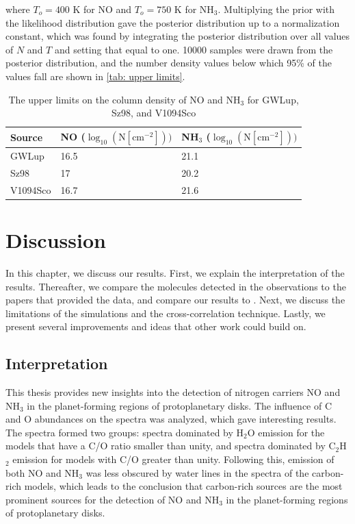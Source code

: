 \documentclass[oneside, single, authoryear, semicolon, 12pt]{lion-msc}
\newcommand{\4}{$_4$}
\newcommand{\3}{$_3$}
\newcommand{\2}{$_2$}
\begin{document}
where $T_o=400$ K for NO and $T_o=750$ K for NH\3. Multiplying the prior with the likelihood distribution gave the posterior distribution up to a normalization constant, which was found by integrating the posterior distribution over all values of $N$ and $T$ and setting that equal to one. 10000 samples were drawn from the posterior distribution, and the number density values below which 95\% of the values fall are shown in \autoref{tab: upper limits}.

\begin{table}[H]
\begin{tabular}{lll}
\hline
Source   & NO ($\log_{10}(\mathrm{N[cm^{-2}]}))$   & NH\3 ($\log_{10}(\mathrm{N[cm^{-2}]}))$\\ \hline
GWLup    & 16.5 & 21.1               \\
Sz98     & 17   & 20.2               \\
V1094Sco & 16.7 & 21.6               \\ \hline
\end{tabular}
\caption{The upper limits on the column density of NO and NH\3 for GWLup, Sz98, and V1094Sco}
\label{tab: upper limits}
\end{table}



\chapter{Discussion}\label{Ch: Discussion}
In this chapter, we discuss our results. First, we explain the interpretation of the results. Thereafter, we compare the molecules detected in the observations to the papers that provided the data, and compare our results to \cite{groningenthesis}. Next, we discuss the limitations of the simulations and the cross-correlation technique. Lastly, we present several improvements and ideas that other work could build on.
\section{Interpretation}
This thesis provides new insights into the detection of nitrogen carriers NO and NH\3 in the planet-forming regions of protoplanetary disks. The influence of C and O abundances on the spectra was analyzed, which gave interesting results. The spectra formed two groups: spectra dominated by H\2O emission for the models that have a C/O ratio smaller than unity, and spectra dominated by C\2H\2 emission for models with C/O greater than unity. Following this, emission of both NO and NH\3 was less obscured by water lines in the spectra of the carbon-rich models, which leads to the conclusion that carbon-rich sources are the most prominent sources for the detection of NO and NH\3 in the planet-forming regions of protoplanetary disks. 
\end{document}
